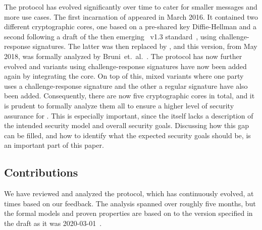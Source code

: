 \documentclass[runningheads,draft,x11names]{llncs}
\begin{document}
The \mEdhoc{} protocol has evolved significantly over time to cater for smaller
messages and more use cases.
%
The first incarnation of \mEdhoc{} appeared in March 2016.
%
It contained two different cryptographic cores, one based on a
pre-shared key Diffie-Hellman and a second following a draft of the
then emerging \mTls\ v1.3 standard~\cite{ietf-tls-tls13-11}, using
challenge-response signatures.
%
The latter was then replaced by \mSigma, and this version, from May 2018, was
formally analyzed by Bruni~et.~al.~\cite{DBLP:conf/secsr/BruniJPS18}.
%
The protocol has now further evolved and variants using challenge-response
signatures have now been added again by integrating the \mOptls{} core.
%
On top of this, mixed variants where one party uses a challenge-response
signature and the other a regular signature have also been added.
%
Consequently, there are now five cryptographic cores in total, and it is prudent
to formally analyze them all to ensure a higher level of security assurance for
\mEdhoc.
%
This is especially important, since the \mSpec{} itself lacks a description
of the intended security model and overall security goals.
%
Discussing how this gap can be filled, and how to identify what the expected
security goals should be, is an important part of this paper.
%

\subsection{Contributions}
\label{sec:contributions}
We have reviewed and analyzed the \mEdhoc{} protocol, which has continuously
evolved, at times based on our feedback.
%
The analysis spanned over roughly five months, but the formal models and proven
properties are based on to the version specified in the draft as it was
2020-03-01~\cite{selander-lake-edhoc-01}.
%
\end{document}
